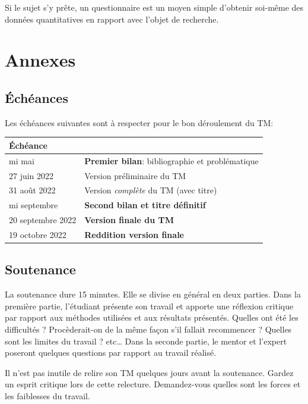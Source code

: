 \documentclass[
  a4paper,
]{book}
\newlength\esp
\begin{document}
Si le sujet s'y prête, un questionnaire est un moyen simple d'obtenir
soi-même des données quantitatives en rapport avec l'objet de recherche.

\part{Annexes}

\hypertarget{uxe9chuxe9ances}{%
\chapter{Échéances}\label{uxe9chuxe9ances}}

Les échéances suivantes sont à respecter pour le bon déroulement du TM:

\begin{longtable*}{ll}
\toprule
Échéance &   \\ 
\midrule
mi mai & \textbf{Premier bilan}: bibliographie et problématique \\ 
27 juin 2022 & Version préliminaire du TM \\ 
31 août 2022 & Version \emph{complète} du TM (avec titre) \\ 
mi septembre & \textbf{Second bilan et titre définitif} \\ 
20 septembre 2022 & \textbf{Version finale du TM} \\ 
19 octobre 2022 & \textbf{Reddition version finale} \\ 
\bottomrule
\end{longtable*}

\hypertarget{soutenance}{%
\chapter{Soutenance}\label{soutenance}}

La soutenance dure 15 minutes. Elle se divise en général en deux
parties. Dans la première partie, l'étudiant présente son travail et
apporte une réflexion critique par rapport aux méthodes utilisées et aux
résultats présentés. Quelles ont été les difficultés ? Procèderait-on de
la même façon s'il fallait recommencer ? Quelles sont les limites du
travail ? etc\ldots{} Dans la seconde partie, le mentor et l'expert
poseront quelques questions par rapport au travail réalisé.

Il n'est pas inutile de relire son TM quelques jours avant la
soutenance. Gardez un esprit critique lors de cette relecture.
Demandez-vous quelles sont les forces et les faiblesses du travail.
\end{document}
